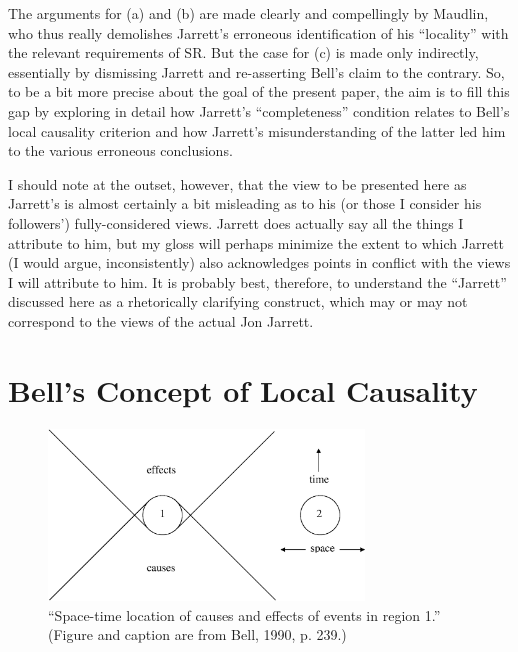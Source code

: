 \documentclass[12pt]{article}
\begin{document}
The arguments for (a) and (b) are made clearly and compellingly by
Maudlin, who thus really demolishes Jarrett's erroneous identification
of his ``locality'' with the relevant requirements of SR.  But the
case for (c) is made only indirectly, essentially by dismissing
Jarrett and re-asserting Bell's claim to the contrary.  So, to be a
bit more precise about the goal of the present paper, the aim is to
fill this gap by exploring in detail how Jarrett's ``completeness''
condition relates to Bell's local causality criterion and how Jarrett's
misunderstanding of the latter led him to the various erroneous
conclusions.  

I should note at the outset, however, that the view to be presented
here as Jarrett's is almost certainly a bit misleading as to his 
(or those I consider his followers') fully-considered views.  Jarrett
does actually say all the things I attribute to him, but my gloss will
perhaps minimize the extent to which Jarrett (I would argue,
inconsistently) also acknowledges points in conflict with the views I
will attribute to him.  It is probably best, therefore, to understand
the ``Jarrett'' discussed here as a rhetorically clarifying construct,
which may or may not correspond to the views of the actual Jon
Jarrett.



\section{Bell's Concept of Local Causality}



\begin{figure}[t]
\begin{center}
\includegraphics[width=3.3in,clip]{./fig1.eps}
\end{center}
\caption{
\label{fig1}
``Space-time location of causes and effects of events in region 1.''
(Figure and caption are from Bell, 1990, p. 239.)
}
\end{figure}
\end{document}

